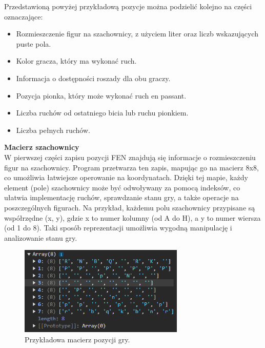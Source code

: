 \documentclass[12pt,a4paper]{article}
\begin{document}
\noindent
Przedstawioną powyżej przykładową pozycje można podzielić kolejno na części oznaczające:

\begin{itemize}
    \item Rozmieszczenie figur na szachownicy, z użyciem liter oraz liczb wskazujących puste pola.
    \item Kolor gracza, który ma wykonać ruch.
    \item Informacja o dostępności roszady dla obu graczy.
    \item Pozycja pionka, który może wykonać ruch en passant.
    \item Liczba ruchów od ostatniego bicia lub ruchu pionkiem.
    \item Liczba pełnych ruchów.
\end{itemize}

\noindent \textbf{Macierz szachownicy}\\
W pierwszej części zapisu pozycji FEN znajdują się informacje o rozmieszczeniu figur na szachownicy. Program przetwarza ten zapis, mapując go na macierz 8x8, co umożliwia łatwiejsze operowanie na koordynatach. Dzięki tej mapie, każdy element (pole) szachownicy może być odwoływany za pomocą indeksów, co ułatwia implementację ruchów, sprawdzanie stanu gry, a także operacje na poszczególnych figurach. Na przykład, każdemu polu szachownicy przypisane są współrzędne (x, y), gdzie x to numer kolumny (od A do H), a y to numer wiersza (od 1 do 8). Taki sposób reprezentacji umożliwia wygodną manipulację i analizowanie stanu gry.

\vspace{0.5cm}
\begin{figure}[h!]
    \centering
    \includegraphics[width=0.7\textwidth]{images/ex_matrix.png}
    \caption{Przykładowa macierz pozycji gry.}
\end{figure}

\newpage
\end{document}
